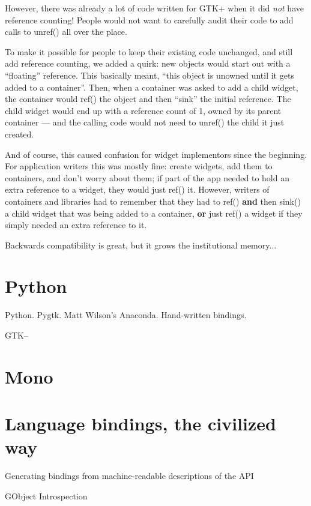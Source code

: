 However, there was already a lot of code written for GTK+ when it did
{\em not} have reference counting!  People would not want to carefully
audit their code to add calls to unref() all over the place.

To make it possible for people to keep their existing code unchanged,
and still add reference counting, we added a quirk:  new objects would
start out with a ``floating'' reference.  This basically meant, ``this
object is unowned until it gets added to a container''.  Then, when a
container was asked to add a child widget, the container would
ref() the object and then ``sink'' the initial reference.  The child
widget would end up with a reference count of 1, owned by its parent
container --- and the calling code would not need to unref() the child
it just created.

And of course, this caused confusion for widget implementors since the
beginning.  For application writers this was mostly fine:  create
widgets, add them to containers, and don't worry about them; if part
of the app needed to hold an extra reference to a widget, they would
just ref() it.  However, writers of containers and libraries had to
remember that they had to ref() {\bf and} then sink() a child widget
that was being added to a container, {\bf or} just ref() a widget if
they simply needed an extra reference to it.

Backwards compatibility is great, but it grows the institutional
memory...

\section{Python}

Python.  Pygtk.  Matt Wilson's Anaconda.  Hand-written bindings.

GTK--

\section{Mono}

\section{Language bindings, the civilized way}

Generating bindings from machine-readable descriptions of the API

GObject Introspection

